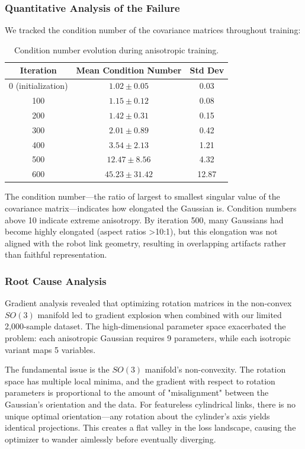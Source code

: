 \documentclass[12pt,a4paper,oneside]{report}
\begin{document}
\subsubsection{Quantitative Analysis of the Failure}

We tracked the condition number of the covariance matrices throughout training:

\begin{table}[H]
\centering
\caption{Condition number evolution during anisotropic training.}
\label{tab:condition_number}
\begin{tabular}{ccc}
\toprule
Iteration & Mean Condition Number & Std Dev \\
\midrule
0 (initialization) & $1.02 \pm 0.05$ & 0.03 \\
100 & $1.15 \pm 0.12$ & 0.08 \\
200 & $1.42 \pm 0.31$ & 0.15 \\
300 & $2.01 \pm 0.89$ & 0.42 \\
400 & $3.54 \pm 2.13$ & 1.21 \\
500 & $12.47 \pm 8.56$ & 4.32 \\
600 & $45.23 \pm 31.42$ & 12.87 \\
\bottomrule
\end{tabular}
\end{table}

The condition number---the ratio of largest to smallest singular value of the covariance matrix---indicates how elongated the Gaussian is. Condition numbers above 10 indicate extreme anisotropy. By iteration 500, many Gaussians had become highly elongated (aspect ratios >10:1), but this elongation was not aligned with the robot link geometry, resulting in overlapping artifacts rather than faithful representation.

\subsubsection{Root Cause Analysis}

Gradient analysis revealed that optimizing rotation matrices in the non-convex $SO(3)$ manifold led to gradient explosion when combined with our limited 2,000-sample dataset. The high-dimensional parameter space exacerbated the problem: each anisotropic Gaussian requires 9 parameters, while each isotropic variant maps 5 variables.

The fundamental issue is the $SO(3)$ manifold's non-convexity. The rotation space has multiple local minima, and the gradient with respect to rotation parameters is proportional to the amount of "misalignment" between the Gaussian's orientation and the data. For featureless cylindrical links, there is no unique optimal orientation---any rotation about the cylinder's axis yields identical projections. This creates a flat valley in the loss landscape, causing the optimizer to wander aimlessly before eventually diverging.
\end{document}
